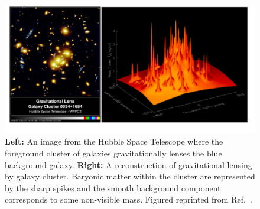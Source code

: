 \fi
\begin{figure}[t!]
	\centering
	\includegraphics[width=\textwidth]{figures/DMOverview/Strong_Grav_lens.png}
	\caption[Effects of gravitational lensing on multiple galaxies alongside the reconstruction of gravitational lensing effects.]{\textbf{Left:} An image from the Hubble Space Telescope where the foreground cluster of galaxies gravitationally lenses the blue background galaxy. \textbf{Right:} A reconstruction of gravitational lensing by galaxy cluster. Baryonic matter within the cluster are represented by the sharp spikes and the smooth background component corresponds to some non-visible mass. Figured reprinted from Ref.~\cite{Freese2009}.}
	\label{fig:DMOverview/StrongGravLens}
\end{figure}
